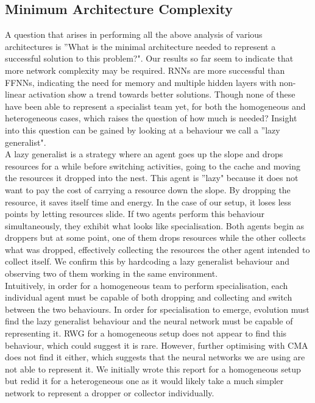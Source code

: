 \documentclass[12pt]{article}
\begin{document}
\subsection{Minimum Architecture Complexity} \label{lazy_generalist}

A question that arises in performing all the above analysis of various architectures is ''What is the minimal architecture needed to represent a successful solution to this problem?".
Our results so far seem to indicate that more network complexity may be required.
RNNs are more successful than FFNNs, indicating the need for memory and multiple hidden layers with non-linear activation show a trend towards better solutions.
Though none of these have been able to represent a specialist team yet, for both the homogeneous and heterogeneous cases, which raises the question of how much is needed?
Insight into this question can be gained by looking at a behaviour we call a ''lazy generalist".\\

A lazy generalist is a strategy where an agent goes up the slope and drops resources for a while before switching activities, going to the cache and moving the resources it dropped into the nest.
This agent is ''lazy" because it does not want to pay the cost of carrying a resource down the slope.
By dropping the resource, it saves itself time and energy.
In the case of our setup, it loses less points by letting resources slide.
If two agents perform this behaviour simultaneously, they exhibit what looks like specialisation.
Both agents begin as droppers but at some point, one of them drops resources while the other collects what was dropped, effectively collecting the resources the other agent intended to collect itself.
We confirm this by hardcoding a lazy generalist behaviour and observing two of them working in the same environment.\\

Intuitively, in order for a homogeneous team to perform specialisation, each individual agent must be capable of both dropping and collecting and switch between the two behaviours.
In order for specialisation to emerge, evolution must find the lazy generalist behaviour and the neural network must be capable of representing it.
RWG for a homogeneous setup does not appear to find this behaviour, which could suggest it is rare.
However, further optimising with CMA does not find it either, which suggests that the neural networks we are using are not able to represent it.
We initially wrote this report for a homogeneous setup but redid it for a heterogeneous one as it would likely take a much simpler network to represent a dropper or collector individually. \\
\end{document}
